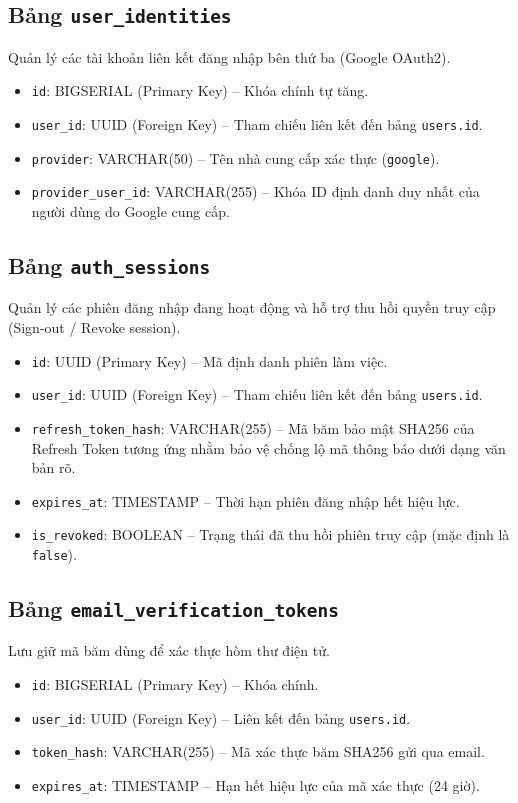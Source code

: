 \documentclass[14pt,a4paper,oneside]{extreport}
\begin{document}
\subsection{Bảng \texttt{user\_identities}}
Quản lý các tài khoản liên kết đăng nhập bên thứ ba (Google OAuth2).
\begin{itemize}[leftmargin=1.5cm]
  \item \texttt{id}: BIGSERIAL (Primary Key) -- Khóa chính tự tăng.
  \item \texttt{user\allowbreak\_id}: UUID (Foreign Key) -- Tham chiếu liên kết đến bảng \texttt{users.id}.
  \item \texttt{provider}: VARCHAR(50) -- Tên nhà cung cấp xác thực (\texttt{google}).
  \item \texttt{provider\allowbreak\_user\allowbreak\_id}: VARCHAR(255) -- Khóa ID định danh duy nhất của người dùng do Google cung cấp.
\end{itemize}

\subsection{Bảng \texttt{auth\_sessions}}
Quản lý các phiên đăng nhập đang hoạt động và hỗ trợ thu hồi quyền truy cập (Sign-out / Revoke session).
\begin{itemize}[leftmargin=1.5cm]
  \item \texttt{id}: UUID (Primary Key) -- Mã định danh phiên làm việc.
  \item \texttt{user\allowbreak\_id}: UUID (Foreign Key) -- Tham chiếu liên kết đến bảng \texttt{users.id}.
  \item \texttt{refresh\allowbreak\_token\allowbreak\_hash}: VARCHAR(255) -- Mã băm bảo mật SHA256 của Refresh Token tương ứng nhằm bảo vệ chống lộ mã thông báo dưới dạng văn bản rõ.
  \item \texttt{expires\allowbreak\_at}: TIMESTAMP -- Thời hạn phiên đăng nhập hết hiệu lực.
  \item \texttt{is\allowbreak\_revoked}: BOOLEAN -- Trạng thái đã thu hồi phiên truy cập (mặc định là \texttt{false}).
\end{itemize}

\subsection{Bảng \texttt{email\_verification\_tokens}}
Lưu giữ mã băm dùng để xác thực hòm thư điện tử.
\begin{itemize}[leftmargin=1.5cm]
  \item \texttt{id}: BIGSERIAL (Primary Key) -- Khóa chính.
  \item \texttt{user\allowbreak\_id}: UUID (Foreign Key) -- Liên kết đến bảng \texttt{users.id}.
  \item \texttt{token\allowbreak\_hash}: VARCHAR(255) -- Mã xác thực băm SHA256 gửi qua email.
  \item \texttt{expires\allowbreak\_at}: TIMESTAMP -- Hạn hết hiệu lực của mã xác thực (24 giờ).
\end{itemize}
\end{document}
